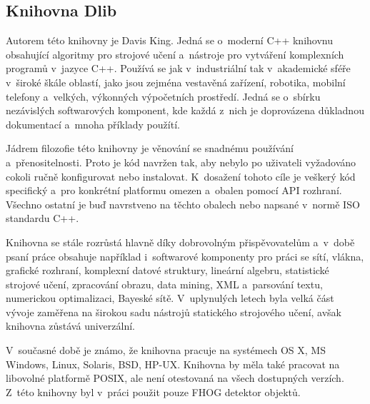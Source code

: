 \subsection{Knihovna Dlib}
Autorem této knihovny je Davis King. Jedná se o~moderní C++ knihovnu obsahující algoritmy pro strojové učení a~nástroje pro vytváření komplexních programů v~jazyce C++. Používá se jak v~industriální tak v~akademické sféře v~široké škále oblastí, jako jsou zejména vestavěná zařízení, robotika, mobilní telefony a~velkých, výkonných výpočetních prostředí. Jedná se o~sbírku nezávislých softwarových komponent, kde každá z~nich je doprovázena důkladnou dokumentací a~mnoha příklady použítí.

Jádrem filozofie této knihovny je věnování se snadnému používání a~přenositelnosti. Proto je kód navržen tak, aby nebylo po uživateli vyžadováno cokoli ručně konfigurovat nebo instalovat. K~dosažení tohoto cíle je veškerý kód specifický a~pro konkrétní platformu omezen a~obalen pomocí API rozhraní. Všechno ostatní je buď navrstveno na těchto obalech nebo napsané v~normě ISO standardu C++. 

Knihovna se stále rozrůstá hlavně díky dobrovolným přispěvovatelům a~v~době psaní práce obsahuje například i~softwarové komponenty pro práci se sítí, vlákna, grafické rozhraní, komplexní datové struktury, lineární algebru, statistické strojové učení, zpracování obrazu, data mining, XML a~parsování textu, numerickou optimalizaci, Bayeské sítě. V~uplynulých letech byla velká část vývoje zaměřena na širokou sadu nástrojů statického strojového učení, avšak knihovna zůstává univerzální.  

V~současné době je známo, že knihovna pracuje na systémech OS X, MS Windows, Linux, Solaris, BSD, HP-UX. Knihovna by měla také pracovat na libovolné platformě POSIX, ale není otestovaná na všech dostupných verzích. 
Z~této knihovny byl v~práci použit pouze FHOG detektor objektů.


